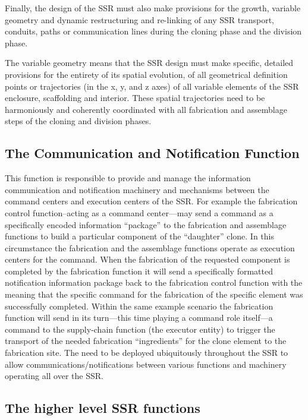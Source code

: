 Finally, the design of the SSR must also make provisions for the growth,
variable geometry and dynamic restructuring and re-linking of any SSR
transport, conduits, paths or communication lines during the cloning
phase and the division phase.

The variable geometry means that the SSR design must make specific,
detailed provisions for the entirety of its spatial evolution, of all geometrical
definition points or trajectories (in the x, y, and z axes) of all variable
elements of the SSR enclosure, scaffolding and interior. These spatial
trajectories need to be harmoniously and coherently coordinated with
all fabrication and assemblage steps of the cloning and division
phases.

\subsection[The Communication and Notification Function]{The
Communication and Notification Function}

This function is responsible to
provide and manage the information communication and notification
machinery and mechanisms between the command centers and execution
centers of the SSR. For example the fabrication control 
function--acting as a command center---may send a command as a specifically
encoded information “package”  to the fabrication and assemblage
functions to build a particular component of the “daughter” clone. In
this circumstance the fabrication and the assemblage functions operate
as execution centers for the command. When the fabrication of the
requested component is completed by the fabrication function it will
send a specifically formatted notification information package back to
the fabrication control function with the meaning that the specific
command for the fabrication of the specific element was successfully
completed. Within the same example scenario the fabrication function
will send in its turn---this time playing a command role itself---a
command to the supply-chain function (the executor entity) to trigger
the transport of the needed fabrication “ingredients” for the clone
element to the fabrication site. The  
need to be deployed ubiquitously throughout the
SSR to allow communications/notifications between various functions and
machinery operating all over the SSR.

\subsection[The higher level SSR functions]{The higher level SSR
functions}

